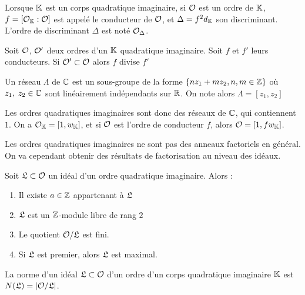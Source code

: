 \begin{Def}
	Lorsque $\mathbb{K}$ est un corps quadratique imaginaire, si $\mathcal{O}$ est un ordre de $\mathbb{K}$, $f = \left[ \mathcal{O}_{\mathbb{K}} : \mathcal{O}\right]$ est appelé le conducteur de $\mathcal{O}$, et $\Delta = f^2d_{\mathbb{K}}$ son discriminant. L'ordre de discriminant $\Delta$ est noté $\mathcal{O}_{\Delta}$.
\end{Def}

\begin{Prop}
	Soit $\mathcal{O}$, $\mathcal{O}'$ deux ordres d'un $\mathbb{K}$ quadratique imaginaire. Soit $f$ et $f'$ leurs conducteurs. Si $\mathcal{O}'\subset\mathcal{O}$ alors $f$ divise $f'$
\end{Prop}

\begin{Def}
	Un réseau $\Lambda$ de $\mathbb{C}$ est un sous-groupe de la forme $\left\lbrace nz_{1} + mz_{2} , n,m\in\mathbb{Z}\right\rbrace$ où $z_{1},\; z_{2}\in\mathbb{C}$ sont linéairement indépendants sur $\mathbb{R}$. On note alors $\Lambda = \left[ z_{1}, z_{2}\right] $
\end{Def}

\begin{Rem}
	Les ordres quadratiques imaginaires sont donc des réseaux de $\mathbb{C}$, qui contiennent $1$. On a $\mathcal{O}_{\mathbb{K}} = \left[1 , w_{\mathbb{K}}\right]$, et si $\mathcal{O}$ est l'ordre de conducteur $f$, alors $\mathcal{O} = \left[ 1, fw_{\mathbb{K}}\right]$.
\end{Rem}

Les ordres quadratiques imaginaires ne sont pas des anneaux factoriels en général. On va cependant obtenir des résultats de factorisation au niveau des idéaux. 

\begin{Prop}
	
	 Soit $\mathfrak{L}\subset\mathcal{O}$ un idéal d'un ordre quadratique imaginaire. Alors :
	\begin{enumerate}
		\item Il existe $a\in\mathbb{Z}$ appartenant à $\mathfrak{L}$
		\item $\mathfrak{L}$ est un $\mathbb{Z}$-module libre de rang $2$
		\item Le quotient $\mathcal{O}/\mathfrak{L}$ est fini.
		\item Si $\mathfrak{L}$ est premier, alors $\mathfrak{L}$ est maximal. 
	\end{enumerate}
\end{Prop}

\begin{Def}
	La norme d'un idéal $\mathfrak{L}\subset\mathcal{O}$ d'un ordre d'un corps quadratique imaginaire $\mathbb{K}$ est $N(\mathfrak{L}) = |\mathcal{O}/\mathfrak{L}|$.
\end{Def}

